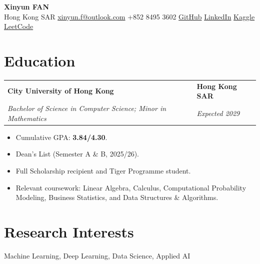 \documentclass[11pt,a4paper]{article}
\makeatletter
\newcommand{\educationHeading}[4]{
  \begin{tabularx}{\textwidth}{
    @{}X>{\raggedleft\arraybackslash}p{0.3\textwidth}@{}
  }
    \textbf{#1} & \textbf{#2} \\
    \textit{#3} & \textit{#4}
  \end{tabularx}
  \vspace{-1.5pt}
}
\makeatother
\begin{document}

\begin{center}
  {\Huge\bfseries Xinyun FAN}\\[6pt]

  \small
  Hong Kong SAR
  \enspace\textbullet\enspace
  \href{mailto:xinyun.f@outlook.com}{xinyun.f@outlook.com}
  \enspace\textbullet\enspace
  +852 8495 3602
  \enspace\textbullet\enspace
  \href{https://github.com/xinyunfan2-dev}{GitHub}
  \enspace\textbullet\enspace
  \href{https://www.linkedin.com/in/xinyun-fan-39a0033a8/}{LinkedIn}
  \enspace\textbullet\enspace
  \href{https://www.kaggle.com/shuminghao}{Kaggle}
  \enspace\textbullet\enspace
  \href{https://leetcode.cn/u/adoring-montalcinixex/}{LeetCode}
\end{center}

\vspace{-6pt}



\section{Education}

\educationHeading
  {City University of Hong Kong}
  {Hong Kong SAR}
  {Bachelor of Science in Computer Science; Minor in Mathematics}
  {Expected 2029}

\begin{itemize}
  \item Cumulative GPA: \textbf{3.84/4.30}.
  \item Dean's List (Semester A \& B, 2025/26).
  \item Full Scholarship recipient and Tiger Programme student.
  \item Relevant coursework: Linear Algebra, Calculus, Computational Probability Modeling, Business Statistics, and Data Structures \& Algorithms.
\end{itemize}



\section{Research Interests}

Machine Learning, Deep Learning, Data Science, Applied AI


\end{document}

